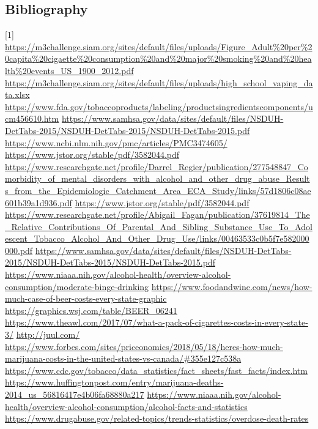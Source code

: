 \subsection{Bibliography}
[1] \url{https://m3challenge.siam.org/sites/default/files/uploads/Figure_Adult%20per%20capita%20cigaette%20consumption%20and%20major%20smoking%20and%20health%20events_US_1900_2012.pdf}
\newline
[2]  \url{https://m3challenge.siam.org/sites/default/files/uploads/high_school_vaping_data.xlsx}
\newline
[3] \url{https://www.fda.gov/tobaccoproducts/labeling/productsingredientscomponents/ucm456610.htm}
\newline
[4] \url{https://www.samhsa.gov/data/sites/default/files/NSDUH-DetTabs-2015/NSDUH-DetTabs-2015/NSDUH-DetTabs-2015.pdf}
\newline
[5] \url{https://www.ncbi.nlm.nih.gov/pmc/articles/PMC3474605/}
\newline
[6] \url{https://www.jstor.org/stable/pdf/3582044.pdf} \url{https://www.researchgate.net/profile/Darrel_Regier/publication/277548847_Comorbidity_of_mental_disorders_with_alcohol_and_other_drug_abuse_Results_from_the_Epidemiologic_Catchment_Area_ECA_Study/links/57d1806c08ae601b39a1d936.pdf}
\newline
[7]  \url{https://www.jstor.org/stable/pdf/3582044.pdf}
\newline
[8] \url{https://www.researchgate.net/profile/Abigail_Fagan/publication/37619814_The_Relative_Contributions_Of_Parental_And_Sibling_Substance_Use_To_Adolescent_Tobacco_Alcohol_And_Other_Drug_Use/links/00463533c0b5f7e582000000.pdf}
\newline
[10] \url{https://www.samhsa.gov/data/sites/default/files/NSDUH-DetTabs-2015/NSDUH-DetTabs-2015/NSDUH-DetTabs-2015.pdf}
\newline
[11] \url{https://www.niaaa.nih.gov/alcohol-health/overview-alcohol-consumption/moderate-binge-drinking}
\newline
[12] \url{https://www.foodandwine.com/news/how-much-case-of-beer-costs-every-state-graphic}
\newline
[13] \url{https://graphics.wsj.com/table/BEER_06241}
\newline
[14] \url{https://www.theawl.com/2017/07/what-a-pack-of-cigarettes-costs-in-every-state-3/}
\newline
[15] \url{http://juul.com/}
\newline
[16] \url{https://www.forbes.com/sites/priceonomics/2018/05/18/heres-how-much-marijuana-costs-in-the-united-states-vs-canada/#355e127c538a}
\newline
[17] \url{https://www.cdc.gov/tobacco/data_statistics/fact_sheets/fast_facts/index.htm}
\newline
[18] \url{https://www.huffingtonpost.com/entry/marijuana-deaths-2014_us_56816417e4b06fa68880a217}
\newline
[19] \url{https://www.niaaa.nih.gov/alcohol-health/overview-alcohol-consumption/alcohol-facts-and-statistics}
\newline
[20] \url{https://www.drugabuse.gov/related-topics/trends-statistics/overdose-death-rates}

